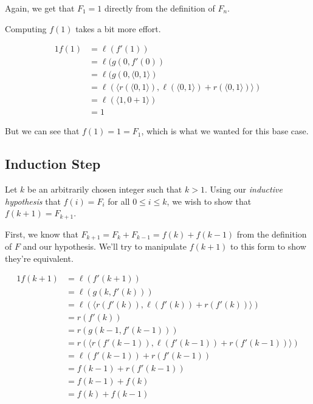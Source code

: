 \documentclass{article}
\begin{document}
Again, we get that $F_1 = 1$ directly from the definition of $F_n$.

Computing $f(1)$ takes a bit more effort.

\begin{alignat*}{1}
  f(1) &= \ell(f'(1)) \\
       &= \ell(g(0, f'(0)) \\
       &= \ell(g(0, \langle 0, 1 \rangle) \\
       &= \ell(\langle 
                 r(\langle 0, 1 \rangle), 
                 \ell(\langle 0, 1 \rangle) + r(\langle 0, 1 \rangle) 
               \rangle) \\
       &= \ell(\langle 1, 0 + 1 \rangle) \\
       &= 1
\end{alignat*}

But we can see that $f(1) = 1 = F_1$, which is what we wanted for this
base case.

\subsection*{Induction Step}

Let $k$ be an arbitrarily chosen integer such that $k > 1$. Using our
\textit{inductive hypothesis} that $f(i) = F_i$ for all
$0 \le i \le k$, we wish to show that $f(k+1) = F_{k+1}$.

First, we know that $F_{k+1} = F_{k} + F_{k-1} = f(k) + f(k-1)$ from
the definition of $F$ and our hypothesis. We'll try to manipulate
$f(k+1)$ to this form to show they're equivalent.

\begin{alignat}{1}
  f(k+1) &= \ell(f'(k+1)) \\
         &= \ell(g(k, f'(k))) \\
         &= \ell(\langle r(f'(k)), \ell(f'(k)) + r(f'(k)) \rangle)\\
         &= r(f'(k)) \\
         &= r(g(k-1, f'(k-1))) \\ 
         &= r( \langle r(f'(k-1)), \ell(f'(k-1)) + r(f'(k-1)) \rangle )\\
         &= \ell(f'(k-1)) + r(f'(k-1)) \\
         &= f(k-1) + r(f'(k-1)) \\ %
         &= f(k-1) + f(k) \\       %
         &= f(k) + f(k-1)          %
\end{alignat}
\end{document}
